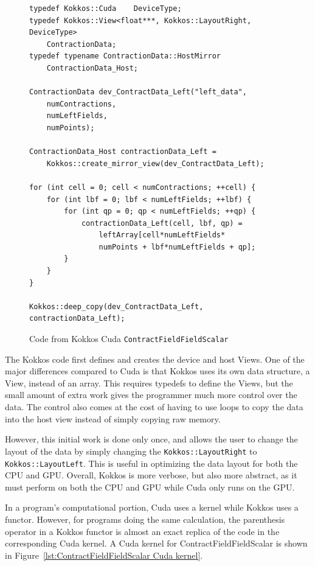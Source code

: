 \begin{figure}[!htb]
	\begin{lstlisting}
typedef Kokkos::Cuda	DeviceType;
typedef Kokkos::View<float***, Kokkos::LayoutRight, DeviceType>
	ContractionData;
typedef typename ContractionData::HostMirror
	ContractionData_Host;

ContractionData dev_ContractData_Left("left_data",
	numContractions,
	numLeftFields,
	numPoints);

ContractionData_Host contractionData_Left = 
	Kokkos::create_mirror_view(dev_ContractData_Left);

for (int cell = 0; cell < numContractions; ++cell) {
	for (int lbf = 0; lbf < numLeftFields; ++lbf) {
		for (int qp = 0; qp < numLeftFields; ++qp) {
			contractionData_Left(cell, lbf, qp) = 
				leftArray[cell*numLeftFields*
				numPoints + lbf*numLeftFields + qp];
		}
	}
}

Kokkos::deep_copy(dev_ContractData_Left, contractionData_Left);
	\end{lstlisting}
\caption{Code from Kokkos Cuda \texttt{ContractFieldFieldScalar}
\label{lst:ContractFieldFieldScalar Kokkos Cuda Data Setup}}
\end{figure}

The Kokkos code first defines and creates the device and host Views. One of the
major differences compared to Cuda is that Kokkos uses its own data structure, a
View, instead of an array. This requires typedefs to define the
Views, but the small amount of extra work gives the
programmer much more control over the data. The control also comes at the cost
of having to use loops to copy the data into the host view instead of simply
copying raw memory.

However, this initial work is done only once, and allows the user to change the
layout of the data by simply changing the \texttt{Kokkos::LayoutRight} to
\texttt{Kokkos::LayoutLeft}.  This is useful in optimizing the data layout for both the
CPU and GPU. Overall, Kokkos is more verbose, but also more abstract, as it must
perform on both the CPU and GPU while Cuda only runs on the GPU. 

In a program's computational portion, Cuda uses a kernel while Kokkos uses a
functor.  However, for programs doing the same calculation, the parenthesis
operator in a Kokkos functor is almost an exact replica of the code in
the corresponding Cuda kernel. A Cuda kernel for ContractFieldFieldScalar is
shown in Figure~\ref{lst:ContractFieldFieldScalar Cuda kernel}.

